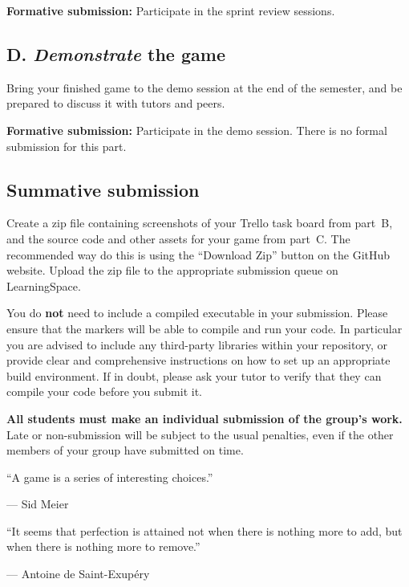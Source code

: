 \documentclass{../fal_assignment}
\begin{document}
\textbf{Formative submission:} Participate in the sprint review sessions.

\subsection*{D. \emph{Demonstrate} the game}

Bring your finished game to the demo session at the end of the semester,
and be prepared to discuss it with tutors and peers.

\textbf{Formative submission:} Participate in the demo session.
    There is no formal submission for this part.

\subsection*{Summative submission}

Create a zip file containing screenshots of your Trello task board from part~B,
and the source code and other assets for your game from part~C.
The recommended way do this is using the ``Download Zip'' button on the GitHub website.
Upload the zip file to the appropriate submission queue on LearningSpace.

You do \textbf{not} need to include a compiled executable in your submission.
Please ensure that the markers will be able to compile and run your code.
In particular you are advised to include any third-party libraries within your repository,
or provide clear and comprehensive instructions on how to set up an appropriate build environment.
If in doubt, please ask your tutor to verify that they can compile your code before you submit it.

\textbf{All students must make an individual submission of the group's work.}
Late or non-submission will be subject to the usual penalties,
even if the other members of your group have submitted on time.

\begin{marginquote}
    ``A game is a series of interesting choices.''
    
    --- Sid Meier
    
    \marginquoterule
    
    ``It seems that perfection is attained not when there is nothing more to add,
        but when there is nothing more to remove.''
    
    --- Antoine de Saint-Exup\'ery
\end{marginquote}
\end{document}
